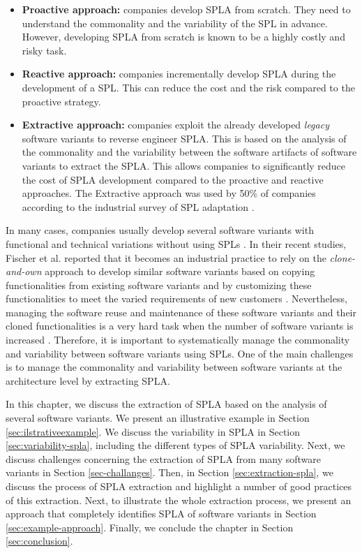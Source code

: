 \documentclass[graybox]{svmult}
\begin{document}
\begin{itemize}
\item \textbf{Proactive approach:} companies develop SPLA from scratch. They need to understand the commonality and the variability of the SPL in advance. However, developing SPLA from scratch is known to be a highly costly and risky task.

\item \textbf{Reactive approach:} companies incrementally develop SPLA during the development of a SPL. This can reduce the cost and the risk compared to the proactive strategy. 

\item \textbf{Extractive approach:} companies exploit the already developed \emph{legacy} software variants to reverse engineer SPLA. This is based on the analysis of the commonality and the variability between the software artifacts of software variants to extract the SPLA. This allows companies to significantly reduce the cost of SPLA development compared to the proactive and reactive approaches. The Extractive approach was used by 50\% of companies according to the industrial survey of SPL adaptation \cite{berger2013survey}. 
\end{itemize}

In many cases, companies usually develop several software variants with functional and technical variations without using SPLs \cite{dubinsky2013exploratory,fischer2014enhancing}. In their recent studies, Fischer et al. \cite{fischer2014enhancing} reported that it becomes an industrial practice to rely on the \textit{clone-and-own} approach to develop similar software variants based on copying functionalities from existing software variants and by customizing these functionalities to meet the varied requirements of new customers \cite{fischer2014enhancing}. Nevertheless, managing the software reuse and maintenance of these software variants and their cloned functionalities is a very hard task when the number of software variants is increased \cite{dubinsky2013exploratory}. Therefore, it is important to systematically manage the commonality and variability between software variants using SPLs. One of the main challenges is to manage the commonality and variability between software variants at the architecture level by extracting SPLA. 


In this chapter, we discuss the extraction of SPLA based on the analysis of several software variants. {We present an illustrative example in Section \ref{sec:ilstrativeexample}.}
We discuss the variability in SPLA in Section \ref{sec:variability-spla}, including the different types of SPLA variability. 
Next, we discuss challenges concerning the extraction of SPLA from many software variants in Section \ref{sec-challanges}. 
Then, in Section \ref{sec:extraction-spla}, we discuss the process of SPLA extraction and highlight a number of good practices of this extraction. Next, to illustrate the whole extraction process, we present an approach that completely identifies SPLA of software variants in Section \ref{sec:example-approach}. Finally, we conclude the chapter in Section \ref{sec:conclusion}.
\end{document}
